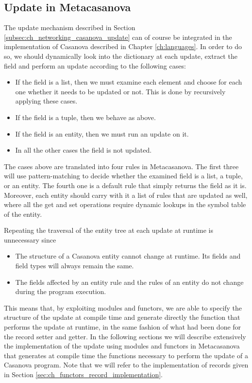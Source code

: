 \subsection{Update in Metacasanova}
\label{subsec:ch+networking_update_metacasanova}
The update mechanism described in Section \ref{subsec:ch_networking_casanova_update} can of course be integrated in the implementation of Casanova described in Chapter \ref{ch:languages}. In order to do so, we should dynamically look into the dictionary at each update, extract the field and perform an update according to the following cases:

\begin{itemize}[noitemsep]
	\item If the field is a list, then we must examine each element and choose for each one whether it needs to be updated or not. This is done by recursively applying these cases.
	\item If the field is a tuple, then we behave as above.
	\item If the field is an entity, then we must run an update on it.
	\item In all the other cases the field is not updated.
\end{itemize}

\noindent
The cases above are translated into four rules in Metacasanova. The first three will use pattern-matching to decide whether the examined field is a list, a tuple, or an entity. The fourth one is a default rule that simply returns the field as it is. Moreover, each entity should carry with it a list of rules that are updated as well, where all the get and set operations require dynamic lookups in the symbol table of the entity.

Repeating the traversal of the entity tree at each update at runtime is unnecessary since

\begin{itemize}[noitemsep]
	\item The structure of a Casanova entity cannot change at runtime. Its fields and field types will always remain the same.
	\item The fields affected by an entity rule and the rules of an entity do not change during the program execution.
\end{itemize}

\noindent
This means that, by exploiting modules and functors, we are able to specify the structure of the update at compile time and generate directly the function that performs the update at runtime, in the same fashion of what had been done for the record setter and getter. In the following sections we will describe extensively the implementation of the update using modules and functors in Metacasanova that generates at compile time the functions necessary to perform the update of a Casanova program. Note that we will refer to the implementation of records given in Section \ref{sec:ch_functors_record_implementation}.

